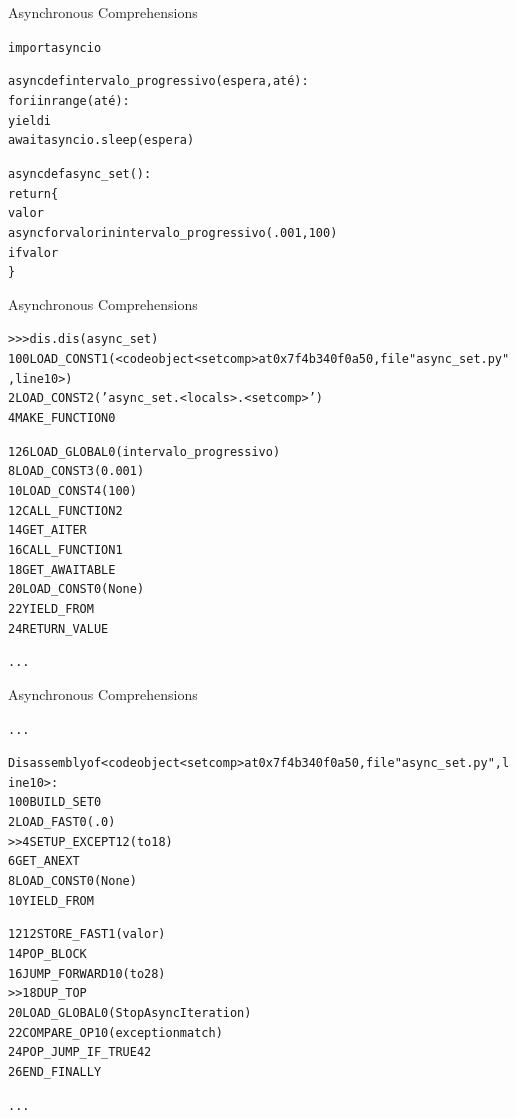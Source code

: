 \documentclass[11pt]{beamer}
\begin{document}
\begin{frame}[fragile]{Asynchronous Comprehensions}
\vspace*{-.25cm}
  \begin{alltt}\scriptsize
import asyncio


async def intervalo_progressivo(espera, até):
    for i in range(até):
        yield i
        await asyncio.sleep(espera)


async def async_set():
    return \{
        valor
        async for valor in intervalo_progressivo(.001, 100)
        if valor %
    \}
\end{alltt}
\end{frame}


\begin{frame}[fragile]{Asynchronous Comprehensions}
\vspace*{-.25cm}
  \begin{alltt}\tiny
>>> dis.dis(async_set)
 10           0 LOAD_CONST               1 (<code object <setcomp> at 0x7f4b340f0a50, file "async_set.py", line 10>)
              2 LOAD_CONST               2 ('async_set.<locals>.<setcomp>')
              4 MAKE_FUNCTION            0

 12           6 LOAD_GLOBAL              0 (intervalo_progressivo)
              8 LOAD_CONST               3 (0.001)
             10 LOAD_CONST               4 (100)
             12 CALL_FUNCTION            2
             14 GET_AITER
             16 CALL_FUNCTION            1
             18 GET_AWAITABLE
             20 LOAD_CONST               0 (None)
             22 YIELD_FROM
             24 RETURN_VALUE

...
\end{alltt}
\end{frame}

\begin{frame}[fragile]{Asynchronous Comprehensions}
\vspace*{-.25cm}
  \begin{alltt}\tiny
...

Disassembly of <code object <setcomp> at 0x7f4b340f0a50, file "async_set.py", line 10>:
 10           0 BUILD_SET                0
              2 LOAD_FAST                0 (.0)
        >>    4 SETUP_EXCEPT            12 (to 18)
              6 GET_ANEXT
              8 LOAD_CONST               0 (None)
             10 YIELD_FROM

 12          12 STORE_FAST               1 (valor)
             14 POP_BLOCK
             16 JUMP_FORWARD            10 (to 28)
        >>   18 DUP_TOP
             20 LOAD_GLOBAL              0 (StopAsyncIteration)
             22 COMPARE_OP              10 (exception match)
             24 POP_JUMP_IF_TRUE        42
             26 END_FINALLY

...
\end{alltt}
\end{frame}
\end{document}
